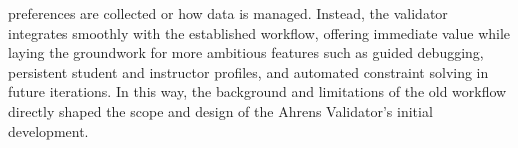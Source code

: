 preferences are collected or how data is managed. Instead, the validator integrates smoothly with the established workflow, offering immediate value while laying the groundwork for more ambitious features such as guided debugging, persistent student and instructor profiles, and automated constraint solving in future iterations. In this way, the background and limitations of the old workflow directly shaped the scope and design of the Ahrens Validator’s initial development.
